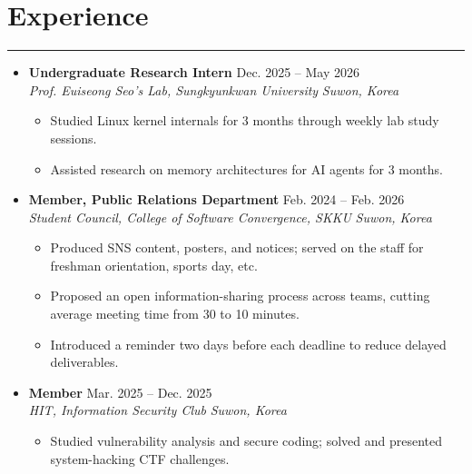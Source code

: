 \documentclass[letterpaper, 10pt]{article}
\begin{document}
\section*{Experience}
\hrule
\vspace{4pt}
\begin{itemize}
   \item[]
       \textbf{Undergraduate Research Intern} \hfill Dec. 2025 -- May 2026 \\
       \textit{Prof. Euiseong Seo's Lab, Sungkyunkwan University} \hfill \textit{Suwon, Korea}
       \begin{itemize}
           \item Studied Linux kernel internals for 3 months through weekly lab study sessions.
           \item Assisted research on memory architectures for AI agents for 3 months.
       \end{itemize}
   \item[]
       \textbf{Member, Public Relations Department} \hfill Feb. 2024 -- Feb. 2026 \\
       \textit{Student Council, College of Software Convergence, SKKU} \hfill \textit{Suwon, Korea}
       \begin{itemize}
           \item Produced SNS content, posters, and notices; served on the staff for freshman orientation, sports day, etc.
           \item Proposed an open information-sharing process across teams, cutting average meeting time from 30 to 10 minutes.
           \item Introduced a reminder two days before each deadline to reduce delayed deliverables.
       \end{itemize}
   \item[]
       \textbf{Member} \hfill Mar. 2025 -- Dec. 2025 \\
       \textit{HIT, Information Security Club} \hfill \textit{Suwon, Korea}
       \begin{itemize}
           \item Studied vulnerability analysis and secure coding; solved and presented system-hacking CTF challenges.
       \end{itemize}
\end{itemize}

\end{document}
